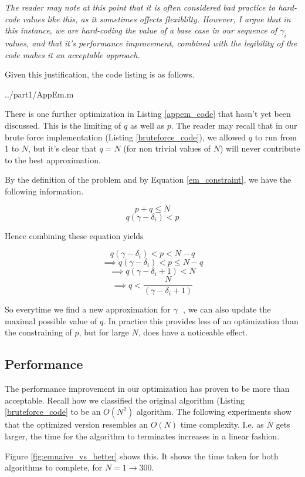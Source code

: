 \documentclass[10pt]{report}
\newcommand*{\gam}{$\gamma \text{ }$}
\newcommand*{\gami}{$\gamma_{i} \text{ }$}
\begin{document}
\emph{The reader may note at this point that it is often considered bad practice to hard-code values like this, as it sometimes offects flexiblilty. However, I argue that in this instance, we are hard-coding the value of a base case in our sequence of \gami values, and that it's performance improvement, combined with the legibility of the code makes it an acceptable approach.}

Given this justification, the code listing is as follows.

   {../part1/AppEm.m}

There is one further optimization in Listing \ref{appem_code} that hasn't yet been discussed. This is the limiting of $q$ as well as $p$. The reader may recall that in our brute force implementation (Listing \ref{bruteforce_code}), we allowed $q$ to run from 1 to $N$, but it's clear that $q = N$ (for non trivial values of $N$) will never contribute to the best approximation.

By the definition of the problem and by Equation \ref{em_constraint}, we have the following information.

$$ p + q \leq N $$
$$ q (\gamma - \delta_i) < p $$

Hence combining these equation yields

$$ q (\gamma - \delta_i) < p < N - q $$ 
$$ \implies  q (\gamma - \delta_i) < p \leq N - q $$ 
$$ \implies q (\gamma - \delta_i + 1) < N  $$ 
$$ \implies q  < \frac{N}{(\gamma - \delta_i + 1)}  $$ 

So everytime we find a new approximation for \gam, we can also update the maximal possible value of $q$. In practice this provides less of an optimization than the constraining of $p$, but for large $N$, does have a noticeable effect.

\subsection{Performance}

The performance improvement in our optimization has proven to be more than acceptable. Recall how we classified the original algorithm (Listing \ref{bruteforce_code} to be an $O(N^2)$ algorithm. The following experiments show that the optimized version resembles an $O(N)$ time complexity. I.e. as $N$ gets larger, the time for the algorithm to terminates increases in a linear fashion.

Figure \ref{fig:emnaive_vs_better} shows this. It shows the time taken for both algorithms to complete, for $N = 1 \rightarrow 300$.
\end{document}
